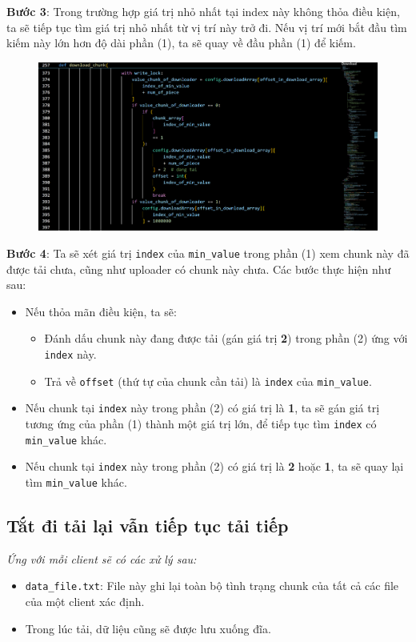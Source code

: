 \documentclass[a4paper]{article}
\begin{document}
\textbf{Bước 3}: Trong trường hợp giá trị nhỏ nhất tại index này không thỏa điều kiện, ta sẽ tiếp tục tìm giá trị nhỏ nhất từ vị trí này trở đi. Nếu vị trí mới bắt đầu tìm kiếm này lớn hơn độ dài phần (1), ta sẽ quay về đầu phần (1) để kiếm.
\begin{figure}[H]
    \centering
    \includegraphics[width=1\textwidth]{images/3.png}
    \captionsetup{labelformat=empty}
\end{figure}
\textbf{Bước 4}: Ta sẽ xét giá trị \texttt{index} của \texttt{min\_value} trong phần (1) xem chunk này đã được tải chưa, cũng như uploader có chunk này chưa. Các bước thực hiện như sau:
\begin{itemize}
    \item Nếu thỏa mãn điều kiện, ta sẽ:
    \begin{itemize}
        \item Đánh dấu chunk này đang được tải (gán giá trị \textbf{2}) trong phần (2) ứng với \texttt{index} này.
        \item Trả về \texttt{offset} (thứ tự của chunk cần tải) là \texttt{index} của \texttt{min\_value}.
    \end{itemize}
    \item Nếu chunk tại \texttt{index} này trong phần (2) có giá trị là \textbf{1}, ta sẽ gán giá trị tương ứng của phần (1) thành một giá trị lớn, để tiếp tục tìm \texttt{index} có \texttt{min\_value} khác.
    \item Nếu chunk tại \texttt{index} này trong phần (2) có giá trị là \textbf{2} hoặc \textbf{1}, ta sẽ quay lại tìm \texttt{min\_value} khác.
\end{itemize}

\subsection{Tắt đi tải lại vẫn tiếp tục tải tiếp}
\textit{Ứng với mỗi client sẽ có các xử lý sau:}
\begin{itemize}
    \item \texttt{data\_file.txt}: File này ghi lại toàn bộ tình trạng chunk của tất cả các file của một client xác định.
    \item Trong lúc tải, dữ liệu cũng sẽ được lưu xuống đĩa.
\end{itemize}
\end{document}
